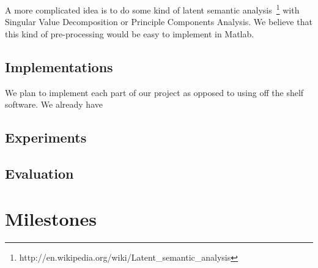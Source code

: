\documentclass[10pt]{article}
\begin{document}
A more complicated idea is to do some kind of latent semantic analysis~\footnote{http://en.wikipedia.org/wiki/Latent\_semantic\_analysis} with Singular Value Decomposition or Principle Components Analysis. We believe that this kind of pre-processing would be easy to implement in Matlab.

\subsection{Implementations}
We plan to implement each part of our project as opposed to using off the shelf software. We already have 

\subsection{Experiments}

\subsection{Evaluation}


\section{Milestones}
\end{document}
